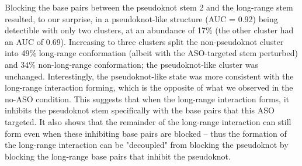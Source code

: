 \documentclass[main.tex]{subfiles}
\begin{document}
Blocking the base pairs between the pseudoknot stem 2 and the long-range stem resulted, to our surprise, in a pseudoknot-like structure (AUC = 0.92) being detectible with only two clusters, at an abundance of 17\% (the other cluster had an AUC of 0.69).
Increasing to three clusters split the non-pseudoknot cluster into 49\% long-range conformation (albeit with the ASO-targeted stem perturbed) and 34\% non-long-range conformation; the pseudoknot-like cluster was unchanged.
Interestingly, the pseudoknot-like state was more consistent with the long-range interaction forming, which is the opposite of what we observed in the no-ASO condition.
This suggests that when the long-range interaction forms, it inhibits the pseudoknot stem specifically with the base pairs that this ASO targeted.
It also shows that the remainder of the long-range interaction can still form even when these inhibiting base pairs are blocked -- thus the formation of the long-range interaction can be "decoupled" from blocking the pseudoknot by blocking the long-range base pairs that inhibit the pseudoknot.
\end{document}
